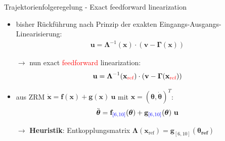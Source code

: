\documentclass[
	ngerman,
	10pt,				%
	aspectratio=169 	%
]{beamer}
\begin{document}

\begin{frame}[t,fragile,label=trajektorienregelung_9]{\large Trajektorienfolgeregelung - Exact feedforward linearization}
	
	\begin{itemize}
		\item bisher Rückführung nach Prinzip der exakten Eingangs-Ausgangs-Linearisierung:
		\begin{align*}
			\mathbf{u} = \boldsymbol{\Lambda }^{-1}(\mathbf{x}) \cdot (\mathbf{v} - \boldsymbol{\Gamma}(\mathbf{x}))
		\end{align*}
		\item[$\rightarrow$] nun exact \textcolor{red}{feedforward} linearization:
		\begin{align*}
			\mathbf{u} = \boldsymbol{\Lambda}^{-1}(\mathbf{x}_{\textcolor{red}{\text{ref}}}) \cdot (\mathbf{v} - \boldsymbol{\Gamma}(\mathbf{x}_{\textcolor{red}{\text{ref}}}))
		\end{align*}
		\pause
		\item aus ZRM $\dot{\mathbf{x}} = \mathbf{f}(\mathbf{x}) + \mathbf{g}(\mathbf{x}) \ \mathbf{u}$ mit $\mathbf{x} = (\boldsymbol{\theta}, \dot{\boldsymbol{\theta}})^T$:
		\begin{align*}
			\ddot{\boldsymbol{\theta}} = \mathbf{f}_{\textcolor{blue}{[6, 10]}}(\boldsymbol{\theta}) + \mathbf{g}_{\textcolor{blue}{[6, 10]}}(\boldsymbol{\theta}) \ \mathbf{u}
		\end{align*}
		\pause
		\item[$\rightarrow$] \textbf{Heuristik}: Entkopplungsmatrix $\boldsymbol{\Lambda}(\mathbf{x}_{\text{ref}}) = \mathbf{g}_{[6, 10]}(\boldsymbol{\theta_{\text{ref}}})$
	\end{itemize}
	

\end{frame}
\end{document}
